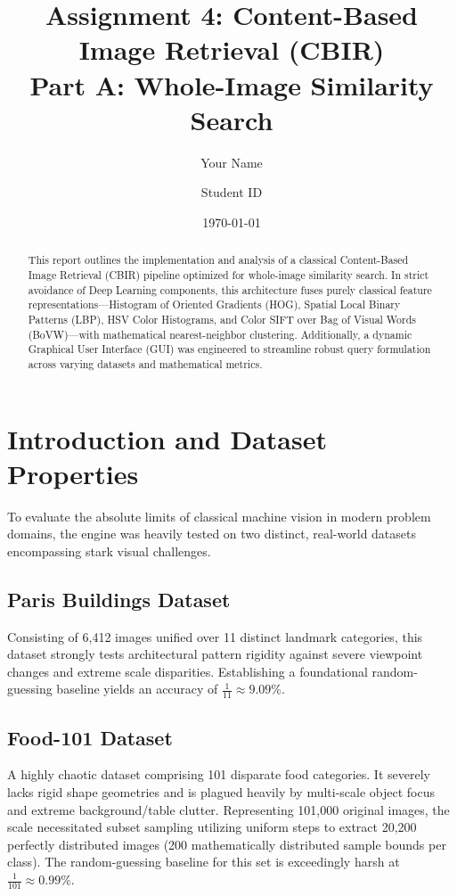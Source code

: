 \documentclass[11pt, a4paper]{article}
\title{Assignment 4: Content-Based Image Retrieval (CBIR) \\ \large Part A: Whole-Image Similarity Search}
\author{Your Name \and Student ID}
\date{\today}
\begin{document}
\maketitle

\begin{abstract}
This report outlines the implementation and analysis of a classical Content-Based Image Retrieval (CBIR) pipeline optimized for whole-image similarity search. In strict avoidance of Deep Learning components, this architecture fuses purely classical feature representations—Histogram of Oriented Gradients (HOG), Spatial Local Binary Patterns (LBP), HSV Color Histograms, and Color SIFT over Bag of Visual Words (BoVW)—with mathematical nearest-neighbor clustering. Additionally, a dynamic Graphical User Interface (GUI) was engineered to streamline robust query formulation across varying datasets and mathematical metrics.
\end{abstract}

\section{Introduction and Dataset Properties}
To evaluate the absolute limits of classical machine vision in modern problem domains, the engine was heavily tested on two distinct, real-world datasets encompassing stark visual challenges.

\subsection{Paris Buildings Dataset}
Consisting of 6,412 images unified over 11 distinct landmark categories, this dataset strongly tests architectural pattern rigidity against severe viewpoint changes and extreme scale disparities. Establishing a foundational random-guessing baseline yields an accuracy of $\frac{1}{11} \approx 9.09\%$.

\subsection{Food-101 Dataset}
A highly chaotic dataset comprising 101 disparate food categories. It severely lacks rigid shape geometries and is plagued heavily by multi-scale object focus and extreme background/table clutter. Representing 101,000 original images, the scale necessitated subset sampling utilizing uniform steps to extract 20,200 perfectly distributed images (200 mathematically distributed sample bounds per class). The random-guessing baseline for this set is exceedingly harsh at $\frac{1}{101} \approx 0.99\%$.
\end{document}
